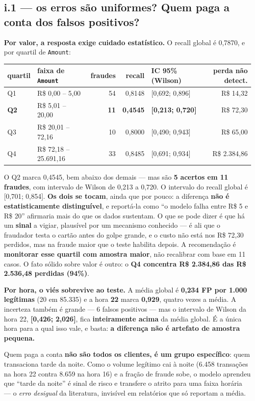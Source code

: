 \documentclass[10pt,a4paper]{article}
\newcommand{\resp}[1]{\subsection{#1}}
\begin{document}
\resp{i.1 --- os erros são uniformes? Quem paga a conta dos falsos positivos?}

\textbf{Por valor, a resposta exige cuidado estatístico.} O recall global é 0,7870, e por
quartil de \texttt{Amount}:

\begin{center}\small
\begin{tabular}{llrrlr}
\toprule
quartil & faixa de \texttt{Amount} & fraudes & recall & IC 95\% (Wilson) & perda não detect.\\
\midrule
Q1 & R\$ 0,00 -- 5,00 & 54 & 0,8148 & [0,692; 0,896] & R\$ 14,32\\
\textbf{Q2} & R\$ 5,01 -- 20,00 & \textbf{11} & \textbf{0,4545} & \textbf{[0,213; 0,720]} & R\$ 72,30\\
Q3 & R\$ 20,01 -- 72,16 & 10 & 0,8000 & [0,490; 0,943] & R\$ 65,00\\
Q4 & R\$ 72,18 -- 25.691,16 & 33 & 0,8485 & [0,691; 0,934] & R\$ 2.384,86\\
\bottomrule
\end{tabular}
\end{center}

O Q2 marca 0,4545, bem abaixo dos demais --- mas são \textbf{5 acertos em 11 fraudes}, com
intervalo de Wilson de 0,213 a 0,720. O intervalo do recall global é [0,701; 0,854].
\textbf{Os dois se tocam}, ainda que por pouco: a diferença \textbf{não é estatisticamente
distinguível}, e reportá-la como ``o modelo falha entre R\$ 5 e R\$ 20'' afirmaria mais do que
os dados sustentam. O que se pode dizer é que há um \textbf{sinal} a vigiar, plausível por um
mecanismo conhecido --- é ali que o fraudador testa o cartão antes do golpe grande, e o custo
não está nos R\$ 72,30 perdidos, mas na fraude maior que o teste habilita depois. A recomendação
é \textbf{monitorar esse quartil com amostra maior}, não recalibrar com base em 11 casos. O
fato sólido sobre valor é outro: o \textbf{Q4 concentra R\$ 2.384,86 das R\$ 2.536,48 perdidas
(94\%)}.

\textbf{Por hora, o viés sobrevive ao teste.} A média global é \textbf{0,234 FP por 1.000
legítimas} (20 em 85.335) e a hora \textbf{22} marca \textbf{0,929}, quatro vezes a média. A
incerteza também é grande --- 6 falsos positivos --- mas o intervalo de Wilson da hora 22,
\textbf{[0,426; 2,026]}, fica \textbf{inteiramente acima} da média global. É a única hora para
a qual isso vale, e basta: \textbf{a diferença não é artefato de amostra pequena.}

Quem paga a conta \textbf{não são todos os clientes, é um grupo específico}: quem transaciona
tarde da noite. Como o volume legítimo cai à noite (6.458 transações na hora 22 contra 8.659 na
hora 16) e a fração de fraude sobe, o modelo aprendeu que ``tarde da noite'' é sinal de risco e
transfere o atrito para uma faixa horária --- o \emph{erro desigual} da literatura, invisível em
relatórios que só reportam a média.
\end{document}
